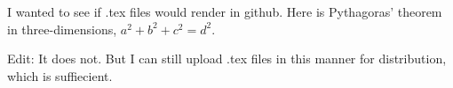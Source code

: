 I wanted to see if .tex files would render in github. Here is Pythagoras' theorem in three-dimensions, $a^2+b^2+c^2=d^2$.

Edit: It does not. But I can still upload .tex files in this manner for distribution, which is suffiecient.
